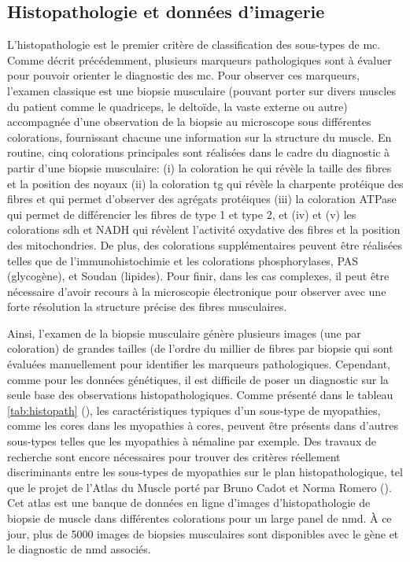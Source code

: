 \subsection{Histopathologie et données d'imagerie }
L'histopathologie est le premier critère de classification des sous-types de \gls{mc}. Comme décrit précédemment, plusieurs marqueurs pathologiques sont à évaluer pour pouvoir orienter le diagnostic des \gls{mc}. Pour observer ces marqueurs, l'examen classique est une biopsie musculaire (pouvant porter sur divers muscles du patient comme le quadriceps, le deltoïde, la vaste externe ou autre) accompagnée d'une observation de la biopsie au microscope sous différentes colorations, fournissant chacune une information sur la structure du muscle. En routine, cinq colorations principales sont réalisées dans le cadre du diagnostic à partir d'une biopsie musculaire: (i) la coloration \gls{he} qui révèle la taille des fibres et la position des noyaux (ii) la coloration \gls{tg} qui révèle la charpente protéique des fibres et qui permet d'observer des agrégats protéiques (iii) la coloration ATPase qui permet de différencier les fibres de type 1 et type 2, et (iv) et (v) les colorations \gls{sdh} et NADH qui révèlent l'activité oxydative des fibres et la position des mitochondries. De plus, des colorations supplémentaires peuvent être réalisées telles que de l'immunohistochimie et les colorations phosphorylases, PAS (glycogène), et Soudan (lipides). Pour finir, dans les cas complexes, il peut être nécessaire d'avoir recours à la microscopie électronique pour observer avec une forte résolution la structure précise des fibres musculaires.

Ainsi, l'examen de la biopsie musculaire génère plusieurs images (une par coloration) de grandes tailles (de l'ordre du millier de fibres par biopsie qui sont évaluées manuellement pour identifier les marqueurs pathologiques. Cependant, comme pour les données génétiques, il est difficile de poser un diagnostic sur la seule base des observations histopathologiques. Comme présenté dans le tableau \ref{tab:histopath} (\cite{jungbluth_congenital_2018}), les caractéristiques typiques d'un sous-type de myopathies, comme les cores dans les myopathies à cores, peuvent être présents dans d'autres sous-types telles que les myopathies à némaline par exemple. Des travaux de recherche sont encore nécessaires pour trouver des critères réellement discriminants entre les sous-types de myopathies sur le plan histopathologique, tel que le projet de l'Atlas du Muscle porté par Bruno Cadot et Norma Romero (\cite{cadot_atlas_2022}). Cet atlas est une banque de données en ligne d'images d'histopathologie de biopsie de muscle dans différentes colorations pour un large panel de \gls{nmd}. À ce jour, plus de 5000 images de biopsies musculaires sont disponibles avec le gène et le diagnostic de \gls{nmd} associés. 

